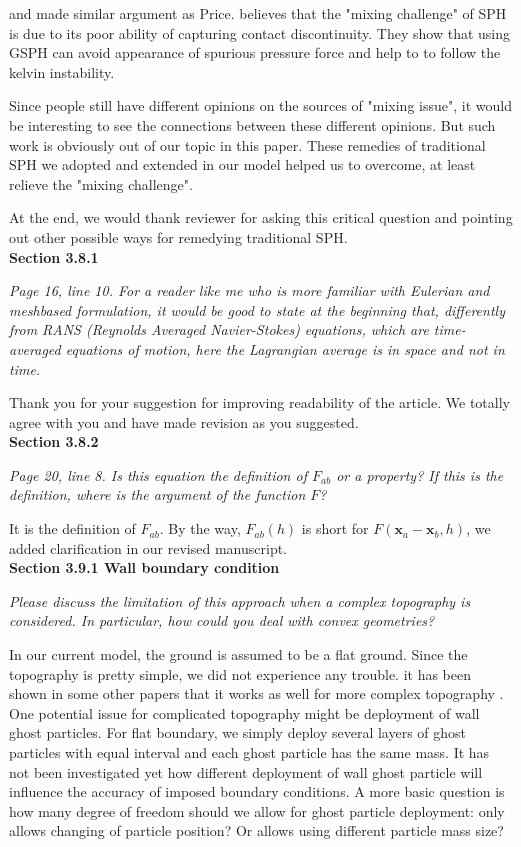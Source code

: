 \documentclass[10pt,a4paper]{article}
\begin{document}
\citet{wadsley2008treatment} and \citet{ritchie2001multiphase} made similar argument as Price. \citet{borgani2012hydrodynamic} believes that the "mixing challenge" of SPH is due to its poor ability of capturing contact discontinuity. They show that using GSPH can avoid appearance of spurious pressure force and help to to follow the kelvin instability.

Since people still have different opinions on the sources of "mixing issue", it would be interesting to see the connections between these different opinions. But such work is obviously out of our topic in this paper. These remedies of traditional SPH we adopted and extended in our model helped us to overcome, at least relieve the "mixing challenge".

At the end, we would thank reviewer for asking this critical question and pointing out other possible ways for remedying traditional SPH.\\[6pt]

\textbf{Section 3.8.1}

\textit{Page 16, line 10. For a reader like me who is more familiar with Eulerian and meshbased formulation, it would be good to state at the beginning that, differently from RANS (Reynolds Averaged Navier-Stokes) equations, which are time-averaged equations of motion, here the Lagrangian average is in space and not in time.}

Thank you for your suggestion for improving readability of the article. We totally agree with you and have made revision as you suggested. \\[6pt]

\textbf{Section 3.8.2}

\textit{Page 20, line 8. Is this equation the definition of $F_{ab}$ or a property? If this is the definition, where is the argument of the function $F$?}

It is the definition of $F_{ab}$. By the way, $F_{ab}(h)$ is short for $F(\textbf{x}_a -\textbf{x}_b, h)$, we added clarification in our revised manuscript. \\[6pt]

\textbf{Section 3.9.1 Wall boundary condition}

\textit{Please discuss the limitation of this approach when a complex topography is considered.
In particular, how could you deal with convex geometries?}

In our current model, the ground is assumed to be a flat ground. Since the topography is pretty simple, we did not experience any trouble. it has been shown in some other papers that it works as well for more complex topography \citep{kumar2013parallel}. One potential issue for complicated topography might be deployment of wall ghost particles. For flat boundary, we simply deploy several layers of ghost particles with equal interval and each ghost particle has the same mass. It has not been investigated yet how different deployment of wall ghost particle will influence the accuracy of imposed boundary conditions. A more basic question is how many degree of freedom should we allow for ghost particle deployment: only allows changing of particle position? Or allows using different particle mass size?
\end{document}
